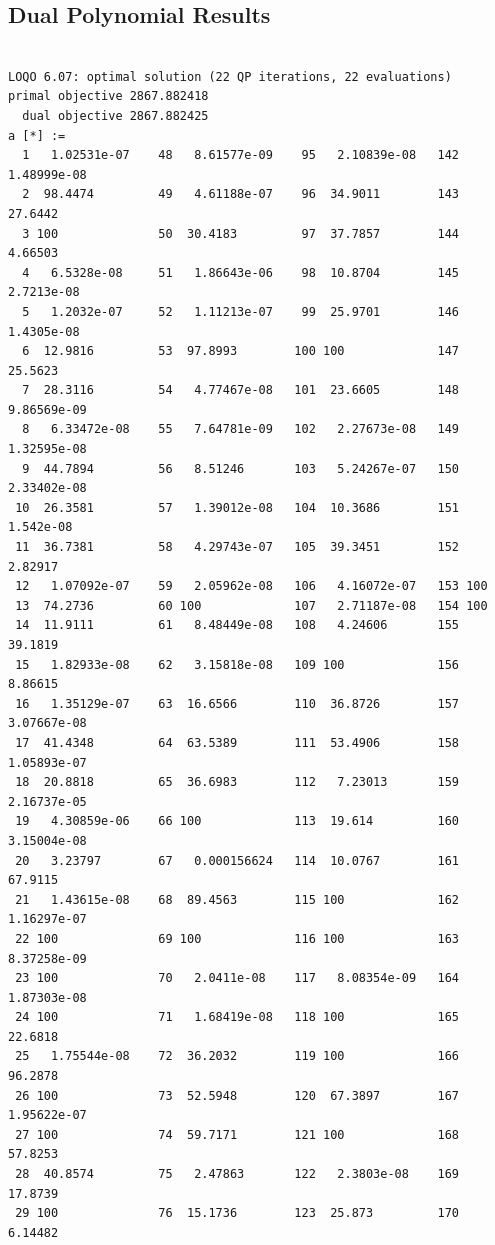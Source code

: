 \documentclass{article}
\begin{document}
\subsection{Dual Polynomial Results}

\begin{verbatim}

LOQO 6.07: optimal solution (22 QP iterations, 22 evaluations)
primal objective 2867.882418
  dual objective 2867.882425
a [*] :=
  1   1.02531e-07    48   8.61577e-09    95   2.10839e-08   142   1.48999e-08
  2  98.4474         49   4.61188e-07    96  34.9011        143  27.6442
  3 100              50  30.4183         97  37.7857        144   4.66503
  4   6.5328e-08     51   1.86643e-06    98  10.8704        145   2.7213e-08
  5   1.2032e-07     52   1.11213e-07    99  25.9701        146   1.4305e-08
  6  12.9816         53  97.8993        100 100             147  25.5623
  7  28.3116         54   4.77467e-08   101  23.6605        148   9.86569e-09
  8   6.33472e-08    55   7.64781e-09   102   2.27673e-08   149   1.32595e-08
  9  44.7894         56   8.51246       103   5.24267e-07   150   2.33402e-08
 10  26.3581         57   1.39012e-08   104  10.3686        151   1.542e-08
 11  36.7381         58   4.29743e-07   105  39.3451        152   2.82917
 12   1.07092e-07    59   2.05962e-08   106   4.16072e-07   153 100
 13  74.2736         60 100             107   2.71187e-08   154 100
 14  11.9111         61   8.48449e-08   108   4.24606       155  39.1819
 15   1.82933e-08    62   3.15818e-08   109 100             156   8.86615
 16   1.35129e-07    63  16.6566        110  36.8726        157   3.07667e-08
 17  41.4348         64  63.5389        111  53.4906        158   1.05893e-07
 18  20.8818         65  36.6983        112   7.23013       159   2.16737e-05
 19   4.30859e-06    66 100             113  19.614         160   3.15004e-08
 20   3.23797        67   0.000156624   114  10.0767        161  67.9115
 21   1.43615e-08    68  89.4563        115 100             162   1.16297e-07
 22 100              69 100             116 100             163   8.37258e-09
 23 100              70   2.0411e-08    117   8.08354e-09   164   1.87303e-08
 24 100              71   1.68419e-08   118 100             165  22.6818
 25   1.75544e-08    72  36.2032        119 100             166  96.2878
 26 100              73  52.5948        120  67.3897        167   1.95622e-07
 27 100              74  59.7171        121 100             168  57.8253
 28  40.8574         75   2.47863       122   2.3803e-08    169  17.8739
 29 100              76  15.1736        123  25.873         170   6.14482

\end{verbatim}
\end{document}
